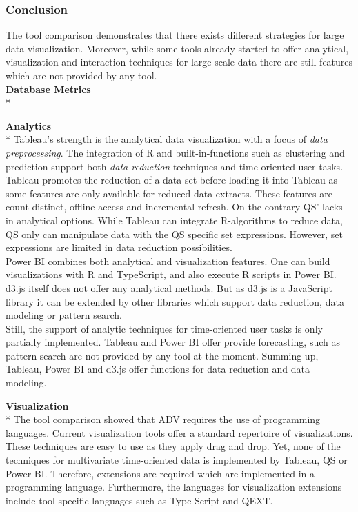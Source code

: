 \subsubsection{Conclusion}\label{conclusion}
The tool comparison demonstrates that there exists different strategies for large data visualization. Moreover, while some tools already started to offer analytical, visualization and interaction techniques for large scale data there are still features which are not provided by any tool.\\
\textbf{Database Metrics}\\*
\par
\textbf{Analytics}\\*
Tableau's strength is the analytical data visualization with a focus of \textit{data preprocessing}. The integration of R and built-in-functions such as clustering and prediction support both \textit{data reduction} techniques and time-oriented user tasks. Tableau  promotes the reduction of a data set before loading it into Tableau as some features are only available for reduced data extracts. These features are count distinct, offline access and incremental refresh. 
On the contrary QS' lacks in analytical options. While Tableau can integrate R-algorithms to reduce data, QS only can manipulate data with the QS specific set expressions. However, set expressions are limited in data reduction possibilities.\\
Power BI combines both analytical and visualization features. One can build visualizations with R and TypeScript, and also execute R scripts in Power BI. \\
d3.js itself does not offer any analytical methods. But as d3.js is a JavaScript library it can be extended by other libraries which support data reduction, data modeling or pattern search.\\
Still, the support of analytic techniques for time-oriented user tasks is only partially implemented. Tableau and Power BI offer provide forecasting,  such as pattern search are not provided by any tool at the moment. 
Summing up, Tableau, Power BI and d3.js offer functions for data reduction and data modeling.
\par
\textbf{Visualization}\\*
The tool comparison showed that ADV requires the use of programming languages. Current visualization tools offer a standard repertoire of visualizations. These techniques are easy to use as they apply drag and drop. Yet, none of the techniques for multivariate time-oriented data is implemented by Tableau, QS or Power BI. Therefore, extensions are required which are implemented in a programming language. Furthermore, the languages for visualization extensions include tool specific languages such as Type Script and QEXT.\\

